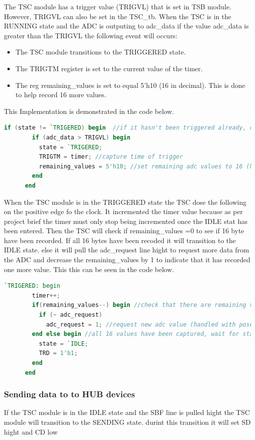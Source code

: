 The TSC module has a trigger value (TRIGVL) that is set in TSB module.
However, TRIGVL can also be set in the TSC\_tb.
When the TSC is in the RUNNING state and the ADC is outputing to adc\_data if the value adc\_data is
greater than the TRIGVL the following event will occurs:

\begin{itemize}
      \item The TSC module transitions to the TRIGGERED state.
      \item The TRIGTM register is set to the current value of the timer.
      \item  The reg remaining\_values is set to equal 5'h10 (16 in decimal). This is done to help record 16 more values.
\end{itemize}

This Implementation is demonstrated in the code below.

\begin{lstlisting}[language=Verilog, caption={Code for triggering event in the TSC module}, label={triggering}]
      if (state != `TRIGERED) begin  //if it hasn't been triggered already, check for a valid trigger
        if (adc_data > TRIGVL) begin
          state = `TRIGERED;
          TRIGTM = timer; //capture time of trigger
          remaining_values = 5'h10; //set remaining adc values to 16 (handled by posedge clk)
        end
      end
\end{lstlisting}


When the TSC module is in the TRIGGERED state the TSC dose the following on the positive edge fo the clock.
It incremented the timer value because as per project brief the timer must only stop being incremented once the IDLE stat has been entered.
Then the TSC will check if remaining\_values =0 to see if 16 byte have been recorded.
If all 16 bytes have been recoded it will transition to the IDLE state.
else it will pull the adc\_request line hight to request more data from the ADC and decrease the remaining\_values by 1 to
indicate that it has recorded one more value. This this can be seen in the code below.

\begin{lstlisting}[language=Verilog, caption={Code for triggering event in the TSC module}, label={triggering}]
      `TRIGERED: begin
        timer++;
        if(remaining_values--) begin //check that there are remaining values left to capture and decrement.
          if (~ adc_request)
            adc_request = 1; //request new adc value (handled with posedge adc_ready)
        end else begin //all 16 values have been captured, wait for start or SBF command
          state = `IDLE; 
          TRD = 1'b1;
        end
      end
\end{lstlisting}

\subsubsection{Sending data to to HUB devices}
If the TSC module is in the IDLE state and the SBF line is pulled hight the TSC module will transition to the SENDING state.
durint this transition it will set SD hight and CD low
















